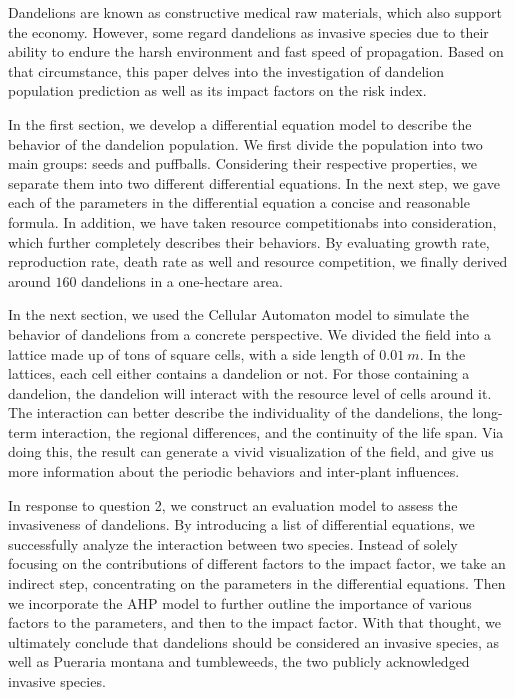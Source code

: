 Dandelions are known as constructive medical raw materials, which also support the economy. However, some regard dandelions as invasive species due to their ability to endure the harsh environment and fast speed of propagation. Based on that circumstance, this paper delves into the investigation of dandelion population prediction as well as its impact factors on the risk index.

In the first section, we develop a differential equation model to describe the behavior of the dandelion population. We first divide the population into two main groups: seeds and puffballs. Considering their respective properties, we separate them into two different differential equations. In the next step, we gave each of the parameters in the differential equation a concise and reasonable formula. In addition, we have taken resource competitionabs into consideration, which further completely describes their behaviors. By evaluating growth rate, reproduction rate, death rate as well and resource competition, we finally derived around $160$ dandelions in a one-hectare area.

In the next section, we used the Cellular Automaton model to simulate the behavior of dandelions from a concrete perspective. We divided the field into a lattice made up of tons of square cells, with a side length of $\SI{0.01}{m}$. In the lattices, each cell either contains a dandelion or not. For those containing a dandelion, the dandelion will interact with the resource level of cells around it. The interaction can better describe the individuality of the dandelions, the long-term interaction, the regional differences, and the continuity of the life span. Via doing this, the result can generate a vivid visualization of the field, and give us more information about the periodic behaviors and inter-plant influences.

In response to question 2, we construct an evaluation model to assess the invasiveness of dandelions. By introducing a list of differential equations, we successfully analyze the interaction between two species. Instead of solely focusing on the contributions of different factors to the impact factor, we take an indirect step, concentrating on the parameters in the differential equations. Then we incorporate the AHP model to further outline the importance of various factors to the parameters, and then to the impact factor. With that thought, we ultimately conclude that dandelions should be considered an invasive species, as well as Pueraria montana and tumbleweeds, the two publicly acknowledged invasive species.